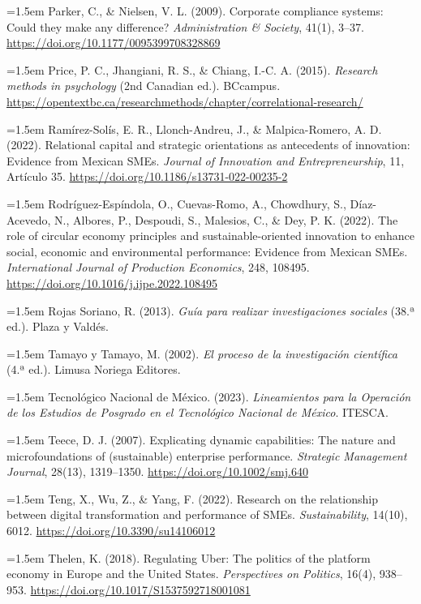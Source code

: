 {\hangindent=1.5em Parker, C., \& Nielsen, V. L. (2009). Corporate compliance systems: Could they make any difference? \textit{Administration \& Society}, 41(1), 3--37. \url{https://doi.org/10.1177/0095399708328869}

\hangindent=1.5em Price, P. C., Jhangiani, R. S., \& Chiang, I.-C. A. (2015). \textit{Research methods in psychology} (2nd Canadian ed.). BCcampus. \url{https://opentextbc.ca/researchmethods/chapter/correlational-research/}

\hangindent=1.5em Ramírez-Solís, E. R., Llonch-Andreu, J., \& Malpica-Romero, A. D. (2022). Relational capital and strategic orientations as antecedents of innovation: Evidence from Mexican SMEs. \textit{Journal of Innovation and Entrepreneurship}, 11, Artículo 35. \url{https://doi.org/10.1186/s13731-022-00235-2}

\hangindent=1.5em Rodríguez-Espíndola, O., Cuevas-Romo, A., Chowdhury, S., Díaz-Acevedo, N., Albores, P., Despoudi, S., Malesios, C., \& Dey, P. K. (2022). The role of circular economy principles and sustainable-oriented innovation to enhance social, economic and environmental performance: Evidence from Mexican SMEs. \textit{International Journal of Production Economics}, 248, 108495. \url{https://doi.org/10.1016/j.ijpe.2022.108495}

\hangindent=1.5em Rojas Soriano, R. (2013). \textit{Guía para realizar investigaciones sociales} (38.ª ed.). Plaza y Valdés.

\hangindent=1.5em Tamayo y Tamayo, M. (2002). \textit{El proceso de la investigación científica} (4.ª ed.). Limusa Noriega Editores.

\hangindent=1.5em Tecnológico Nacional de México. (2023). \textit{Lineamientos para la Operación de los Estudios de Posgrado en el Tecnológico Nacional de México}. ITESCA.

\hangindent=1.5em Teece, D. J. (2007). Explicating dynamic capabilities: The nature and microfoundations of (sustainable) enterprise performance. \textit{Strategic Management Journal}, 28(13), 1319--1350. \url{https://doi.org/10.1002/smj.640}

\hangindent=1.5em Teng, X., Wu, Z., \& Yang, F. (2022). Research on the relationship between digital transformation and performance of SMEs. \textit{Sustainability}, 14(10), 6012. \url{https://doi.org/10.3390/su14106012}

\hangindent=1.5em Thelen, K. (2018). Regulating Uber: The politics of the platform economy in Europe and the United States. \textit{Perspectives on Politics}, 16(4), 938--953. \url{https://doi.org/10.1017/S1537592718001081}

}
